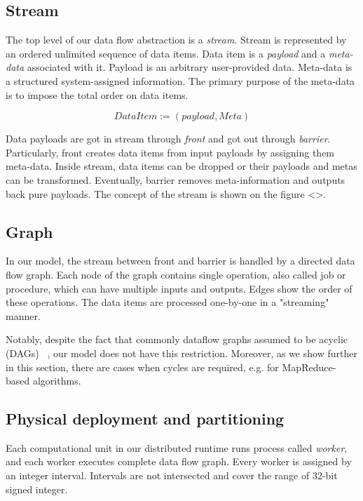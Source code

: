 
\label {fs-data-flow}

\subsection{Stream}

The top level of our data flow abstraction is a {\it stream}. Stream is represented by an ordered unlimited sequence of data items. Data item is a {\it payload} and a {\it meta-data} associated with it. Payload is an arbitrary user-provided data. Meta-data is a structured system-assigned information. The primary purpose of the meta-data is to impose the total order on data items. 

\[DataItem := (payload, Meta)\]

Data payloads are got in stream through {\it front} and got out through {\it barrier}. Particularly, front creates data items from input payloads by assigning them meta-data. Inside stream, data items can be dropped or their payloads and metas can be transformed. Eventually, barrier removes meta-information and outputs back pure payloads. The concept of the stream is shown on the figure <>.

\subsection{Graph}

In our model, the stream between front and barrier is handled by a directed data flow graph. Each node of the graph contains single operation, also called job or procedure, which can have multiple inputs and outputs. Edges show the order of these operations. The data items are processed one-by-one in a "streaming" manner.

Notably, despite the fact that commonly dataflow graphs assumed to be acyclic (DAGs) 
~\cite{Zaharia:2016:ASU:3013530.2934664, Carbone:2017:SMA:3137765.3137777},
our model does not have this restriction. Moreover, as we show further in this section, there are cases when cycles are required, e.g. for MapReduce-based algorithms. 

\subsection{Physical deployment and partitioning}

Each computational unit in our distributed runtime runs process called {\it worker}, and each worker executes complete data flow graph. Every worker is assigned by an integer interval. Intervals are not intersected and cover the range of 32-bit signed integer.

